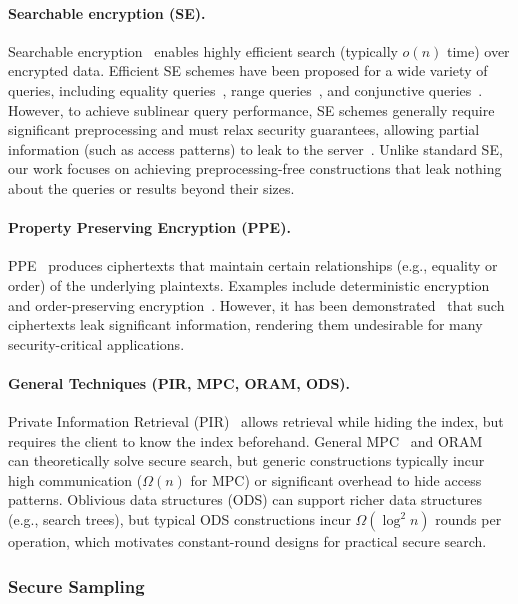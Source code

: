 \paragraph{Searchable encryption (SE).}
Searchable encryption~\cite{SP:SonWagPer00,EC:BDOP04} enables highly efficient search (typically $o(n)$ time) over encrypted data. Efficient SE schemes have been proposed for a wide variety of queries, including equality queries~\cite{CCS:CGKO06, AC:ChaKam10}, range queries~\cite{RSA:IKLO16, CCS:RACY16}, and conjunctive queries~\cite{SP:PKVKMC14, C:CJJKRS13}. However, to achieve sublinear query performance, SE schemes generally require significant preprocessing and must relax security guarantees, allowing partial information (such as access patterns) to leak to the server~\cite{SP:FVYSHG17}. Unlike standard SE, our work focuses on achieving preprocessing-free constructions that leak nothing about the queries or results beyond their sizes.

\paragraph{Property Preserving Encryption (PPE).}
PPE~\cite{EC:PanRou12} produces ciphertexts that maintain certain relationships (e.g., equality or order) of the underlying plaintexts. Examples include deterministic encryption~\cite{C:BelBolONe07} and order-preserving encryption~\cite{EC:BCLO09, C:BolCheONe11}. However, it has been demonstrated~\cite{NDSS:IslKuzKan12, CCS:GMNRS16,SP:GSBNR17} that such ciphertexts leak significant information, rendering them undesirable for many security-critical applications.

\paragraph{General Techniques (PIR, MPC, ORAM, ODS).}
Private Information Retrieval (PIR)~\cite{JACM:CKGS98} allows retrieval while hiding the index, but requires the client to know the index beforehand. General MPC~\cite{FOCS:Yao86} and ORAM~\cite{GO96} can theoretically solve secure search, but generic constructions typically incur high communication ($\Omega(n)$ for MPC) or significant overhead to hide access patterns. Oblivious data structures (ODS) can support richer data structures (e.g., search trees), but typical ODS constructions incur $\Omega(\log^2 n)$ rounds per operation, which motivates constant-round designs for practical secure search.

\subsubsection{Secure Sampling}
